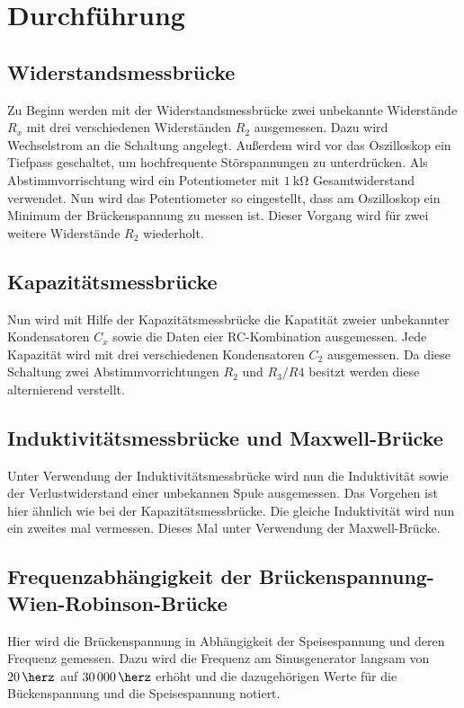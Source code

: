 \section{Durchführung}
\subsection{Widerstandsmessbrücke}
Zu Beginn werden mit der Widerstandsmessbrücke zwei unbekannte Widerstände $R_{x}$ mit
drei verschiedenen Widerständen $R_{2}$ ausgemessen.
Dazu wird Wechselstrom an die Schaltung angelegt. Außerdem wird vor das Oszilloskop
ein Tiefpass geschaltet, um hochfrequente Störspannungen zu unterdrücken.
Als Abstimmvorrischtung wird ein Potentiometer mit $\SI{1}{\kilo\ohm}$ Gesamtwiderstand
verwendet. Nun wird das Potentiometer so eingestellt, dass am Oszilloskop
ein Minimum der Brückenspannung zu messen ist. Dieser Vorgang wird für zwei weitere
Widerstände $R_{2}$ wiederholt.

\subsection{Kapazitätsmessbrücke}
Nun wird mit Hilfe der Kapazitätsmessbrücke die Kapatität zweier unbekannter
Kondensatoren $C_{x}$ sowie die Daten eier RC-Kombination ausgemessen. Jede Kapazität
wird mit drei verschiedenen Kondensatoren $C_{2}$ ausgemessen.
\noindent Da diese Schaltung zwei Abstimmvorrichtungen $R_{2}$ und $R_{3}/R{4}$ besitzt werden diese
alternierend verstellt.

\subsection{Induktivitätsmessbrücke und Maxwell-Brücke}
\noindent Unter Verwendung der Induktivitätsmessbrücke wird nun die Induktivität sowie
der Verlustwiderstand einer unbekannen Spule ausgemessen. Das Vorgehen ist hier
ähnlich wie bei der Kapazitätsmessbrücke.
Die gleiche Induktivität wird nun ein zweites mal vermessen. Dieses Mal unter
Verwendung der Maxwell-Brücke.

\subsection{Frequenzabhängigkeit der Brückenspannung-Wien-Robinson-Brücke}
\noindent Hier wird die Brückenspannung in Abhängigkeit der Speisespannung und deren Frequenz gemessen.
Dazu wird die Frequenz am Sinusgenerator langsam von $\SI{20}{\herz}$ auf $\SI{30000}{\herz}$ erhöht und
die dazugehörigen Werte für die Bückenspannung und die Speisespannung notiert.





\label{sec:Durchführung}
